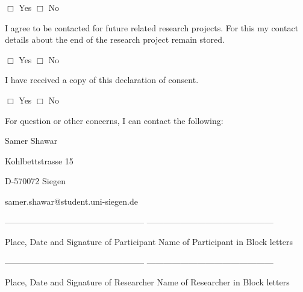  $\Box$ Yes \hspace{15mm}
 $\Box$ No

\vspace{10mm}
I agree to be contacted for future related research projects. For this my contact details about the end of the research project remain stored.


 $\Box$ Yes \hspace{15mm}
 $\Box$ No


\vspace{10mm}
I have received a copy of this declaration of consent.


 $\Box$ Yes \hspace{15mm}
 $\Box$ No



\vspace{5mm}
For question or other concerns, I can contact the following: 


Samer Shawar


Kohlbettstrasse 15


D-570072 Siegen


samer.shawar@student.uni-siegen.de

\vspace{15mm}

--------------------------------------------------  \hspace{20mm}            ---------------------------------------------


Place, Date and Signature of Participant	\hspace{15mm}         	Name of Participant in Block letters
\vspace{10mm}

--------------------------------------------------  \hspace{20mm}            ---------------------------------------------


Place, Date and Signature of Researcher	\hspace{15mm}         	Name of Researcher in Block letters
